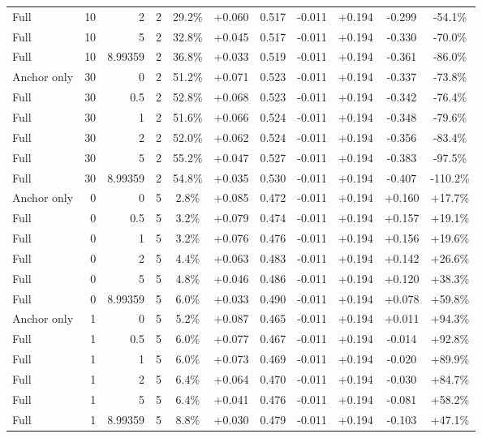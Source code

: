 \begin{table}[htbp]
\begin{tabular}{lrrrccccccc}
Full & 10 & 2 & 2 & 29.2\% & +0.060 & 0.517 & -0.011 & +0.194 & -0.299 & -54.1\% \\
Full & 10 & 5 & 2 & 32.8\% & +0.045 & 0.517 & -0.011 & +0.194 & -0.330 & -70.0\% \\
Full & 10 & 8.99359 & 2 & 36.8\% & +0.033 & 0.519 & -0.011 & +0.194 & -0.361 & -86.0\% \\
Anchor only & 30 & 0 & 2 & 51.2\% & +0.071 & 0.523 & -0.011 & +0.194 & -0.337 & -73.8\% \\
Full & 30 & 0.5 & 2 & 52.8\% & +0.068 & 0.523 & -0.011 & +0.194 & -0.342 & -76.4\% \\
Full & 30 & 1 & 2 & 51.6\% & +0.066 & 0.524 & -0.011 & +0.194 & -0.348 & -79.6\% \\
Full & 30 & 2 & 2 & 52.0\% & +0.062 & 0.524 & -0.011 & +0.194 & -0.356 & -83.4\% \\
Full & 30 & 5 & 2 & 55.2\% & +0.047 & 0.527 & -0.011 & +0.194 & -0.383 & -97.5\% \\
Full & 30 & 8.99359 & 2 & 54.8\% & +0.035 & 0.530 & -0.011 & +0.194 & -0.407 & -110.2\% \\
Anchor only & 0 & 0 & 5 & 2.8\% & +0.085 & 0.472 & -0.011 & +0.194 & +0.160 & +17.7\% \\
Full & 0 & 0.5 & 5 & 3.2\% & +0.079 & 0.474 & -0.011 & +0.194 & +0.157 & +19.1\% \\
Full & 0 & 1 & 5 & 3.2\% & +0.076 & 0.476 & -0.011 & +0.194 & +0.156 & +19.6\% \\
Full & 0 & 2 & 5 & 4.4\% & +0.063 & 0.483 & -0.011 & +0.194 & +0.142 & +26.6\% \\
Full & 0 & 5 & 5 & 4.8\% & +0.046 & 0.486 & -0.011 & +0.194 & +0.120 & +38.3\% \\
Full & 0 & 8.99359 & 5 & 6.0\% & +0.033 & 0.490 & -0.011 & +0.194 & +0.078 & +59.8\% \\
Anchor only & 1 & 0 & 5 & 5.2\% & +0.087 & 0.465 & -0.011 & +0.194 & +0.011 & +94.3\% \\
Full & 1 & 0.5 & 5 & 6.0\% & +0.077 & 0.467 & -0.011 & +0.194 & -0.014 & +92.8\% \\
Full & 1 & 1 & 5 & 6.0\% & +0.073 & 0.469 & -0.011 & +0.194 & -0.020 & +89.9\% \\
Full & 1 & 2 & 5 & 6.4\% & +0.064 & 0.470 & -0.011 & +0.194 & -0.030 & +84.7\% \\
Full & 1 & 5 & 5 & 6.4\% & +0.041 & 0.476 & -0.011 & +0.194 & -0.081 & +58.2\% \\
Full & 1 & 8.99359 & 5 & 8.8\% & +0.030 & 0.479 & -0.011 & +0.194 & -0.103 & +47.1\% \\

\end{tabular}
\end{table}

